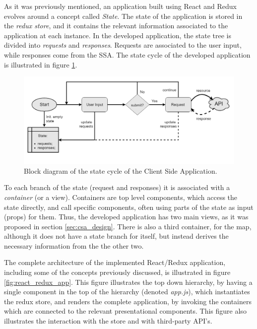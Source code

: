 As it was previously mentioned, an application built using React and Redux evolves around a concept called \textit{State}. The state of the application is stored in the \textit{redux store}, and it contains the relevant information associated to the application at each instance. In the developed application, the state tree is  divided into \textit{requests} and \textit{responses}. Requests are associated to the user input, while responses come from the SSA. The state cycle of the developed application is illustrated in figure \ref{fig:app_state_cycle}.

\begin{figure}[htpb]
  \centering
  \includegraphics[width=\textwidth]{./Figures/system_implementation/state_flow.png}
  \caption{Block diagram of the state cycle of the Client Side Application.}
  \label{fig:app_state_cycle}  
\end{figure}

To each branch of the state (request and responses) it is associated with a \textit{container} (or a view). Containers are top level components, which access the state directly, and call specific components, often using parts of the state as input (props) for them. Thus, the developed application has two main views, as it was proposed in section \ref{sec:csa_design}. There is also a third container, for the map, although it does not have a state branch for itself, but instead derives the necessary information from the the other two. 

The complete architecture of the implemented React/Redux application, including some of the concepts previously discussed, is illustrated in figure \ref{fig:react_redux_app}. This figure illustrates the top down hierarchy, by having a single component in the top of the hierarchy (denoted \textit{app.js}), which instantiates the redux store, and renders the complete application, by invoking the containers which are connected to the relevant presentational components. This figure also illustrates the interaction with the store and with third-party API's. %

